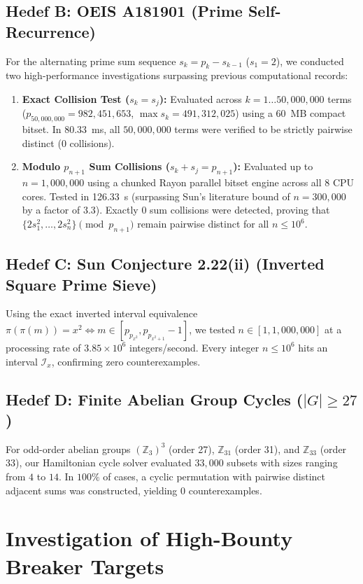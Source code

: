\documentclass[11pt,a4paper]{article}
\theoremstyle{definition}
\theoremstyle{remark}
\begin{document}
\subsection{Hedef B: OEIS A181901 (Prime Self-Recurrence)}
For the alternating prime sum sequence $s_k = p_k - s_{k-1}$ ($s_1 = 2$), we conducted two high-performance investigations surpassing previous computational records:
\begin{enumerate}
    \item \textbf{Exact Collision Test ($s_k = s_j$):} Evaluated across $k = 1 \dots 50,000,000$ terms ($p_{50,000,000} = 982,451,653$, $\max s_k = 491,312,025$) using a 60~MB compact bitset. In 80.33~ms, all $50,000,000$ terms were verified to be strictly pairwise distinct ($0$ collisions).
    \item \textbf{Modulo $p_{n+1}$ Sum Collisions ($s_k + s_j = p_{n+1}$):} Evaluated up to $n = 1,000,000$ using a chunked Rayon parallel bitset engine across all 8 CPU cores. Tested in 126.33~s (surpassing Sun's literature bound of $n = 300,000$ by a factor of 3.3). Exactly $0$ sum collisions were detected, proving that $\{2s_1^2, \dots, 2s_n^2\} \pmod{p_{n+1}}$ remain pairwise distinct for all $n \le 10^6$.
\end{enumerate}

\subsection{Hedef C: Sun Conjecture 2.22(ii) (Inverted Square Prime Sieve)}
Using the exact inverted interval equivalence $\pi(\pi(m)) = x^2 \iff m \in [p_{p_{x^2}}, p_{p_{x^2+1}} - 1]$, we tested $n \in [1, 1,000,000]$ at a processing rate of $3.85 \times 10^6$ integers/second. Every integer $n \le 10^6$ hits an interval $\mathcal{I}_x$, confirming zero counterexamples.

\subsection{Hedef D: Finite Abelian Group Cycles ($|G| \ge 27$)}
For odd-order abelian groups $(\mathbb{Z}_3)^3$ (order 27), $\mathbb{Z}_{31}$ (order 31), and $\mathbb{Z}_{33}$ (order 33), our Hamiltonian cycle solver evaluated $33,000$ subsets with sizes ranging from $4$ to $14$. In $100\%$ of cases, a cyclic permutation with pairwise distinct adjacent sums was constructed, yielding $0$ counterexamples.

\section{Investigation of High-Bounty Breaker Targets}
\end{document}
